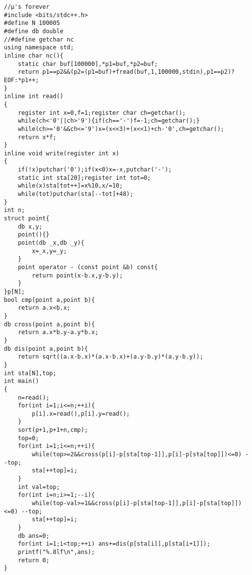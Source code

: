 \begin{verbatim}
//μ's forever
#include <bits/stdc++.h>
#define N 100005
#define db double
//#define getchar nc
using namespace std;
inline char nc(){
    static char buf[100000],*p1=buf,*p2=buf;
    return p1==p2&&(p2=(p1=buf)+fread(buf,1,100000,stdin),p1==p2)?EOF:*p1++;
}
inline int read()
{
    register int x=0,f=1;register char ch=getchar();
    while(ch<'0'||ch>'9'){if(ch=='-')f=-1;ch=getchar();}
    while(ch>='0'&&ch<='9')x=(x<<3)+(x<<1)+ch-'0',ch=getchar();
    return x*f;
}
inline void write(register int x)
{
    if(!x)putchar('0');if(x<0)x=-x,putchar('-');
    static int sta[20];register int tot=0;
    while(x)sta[tot++]=x%10,x/=10;
    while(tot)putchar(sta[--tot]+48);
}
int n;
struct point{
    db x,y;
    point(){}
    point(db _x,db _y){
        x=_x,y=_y;
    }
    point operator - (const point &b) const{
        return point(x-b.x,y-b.y);
    }
}p[N];
bool cmp(point a,point b){
    return a.x<b.x;
}
db cross(point a,point b){
    return a.x*b.y-a.y*b.x;
}
db dis(point a,point b){
    return sqrt((a.x-b.x)*(a.x-b.x)+(a.y-b.y)*(a.y-b.y));
}
int sta[N],top;
int main()
{
    n=read();
    for(int i=1;i<=n;++i){
        p[i].x=read(),p[i].y=read();
    }
    sort(p+1,p+1+n,cmp);
    top=0;
    for(int i=1;i<=n;++i){
        while(top>=2&&cross(p[i]-p[sta[top-1]],p[i]-p[sta[top]])<=0) --top;
        sta[++top]=i;
    }
    int val=top;
    for(int i=n;i>=1;--i){
        while(top-val>=1&&cross(p[i]-p[sta[top-1]],p[i]-p[sta[top]])<=0) --top;
        sta[++top]=i;
    }
    db ans=0;
    for(int i=1;i<top;++i) ans+=dis(p[sta[i]],p[sta[i+1]]);
    printf("%.8lf\n",ans);
    return 0;
}
\end{verbatim}
